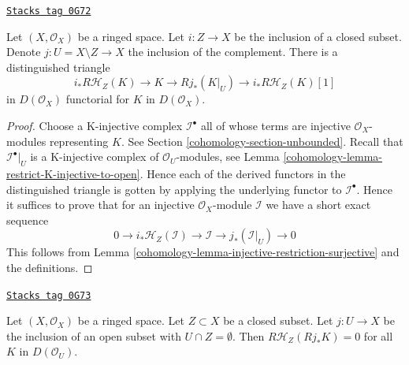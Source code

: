 \begin{lemma}
\label{cohomology-lemma-triangle-sections-with-support-sheaves}
\href{https://stacks.math.columbia.edu/tag/0G72}{\texttt{Stacks tag 0G72}}

Let $(X, \mathcal{O}_X)$ be a ringed space. Let $i : Z \to X$ be the
inclusion of a closed subset. Denote $j : U = X \setminus Z \to X$
the inclusion of the complement. There is a distinguished triangle
$$
i_*R\mathcal{H}_Z(K) \to K \to Rj_*(K|_U) \to
i_*R\mathcal{H}_Z(K)[1]
$$
in $D(\mathcal{O}_X)$ functorial for $K$ in $D(\mathcal{O}_X)$.
\end{lemma}

\begin{proof}

Choose a K-injective complex $\mathcal{I}^\bullet$ all of whose terms
are injective $\mathcal{O}_X$-modules representing $K$. See
Section \ref{cohomology-section-unbounded}. Recall that $\mathcal{I}^\bullet|_U$
is a K-injective complex of $\mathcal{O}_U$-modules, see
Lemma \ref{cohomology-lemma-restrict-K-injective-to-open}. Hence each
of the derived functors in the distinguished triangle is gotten
by applying the underlying functor to $\mathcal{I}^\bullet$.
Hence it suffices to prove that
for an injective $\mathcal{O}_X$-module $\mathcal{I}$ we have
a short exact sequence
$$
0 \to i_*\mathcal{H}_Z(\mathcal{I}) \to \mathcal{I}
\to j_*(\mathcal{I}|_U) \to 0
$$
This follows from Lemma \ref{cohomology-lemma-injective-restriction-surjective}
and the definitions.
\end{proof}

\begin{lemma}
\label{cohomology-lemma-sections-support-in-closed-disjoint-open}
\href{https://stacks.math.columbia.edu/tag/0G73}{\texttt{Stacks tag 0G73}}

Let $(X, \mathcal{O}_X)$ be a ringed space. Let $Z \subset X$
be a closed subset. Let $j : U \to X$ be the inclusion of
an open subset with $U \cap Z = \emptyset$. Then
$R\mathcal{H}_Z(Rj_*K) = 0$ for all $K$ in $D(\mathcal{O}_U)$.
\end{lemma}

